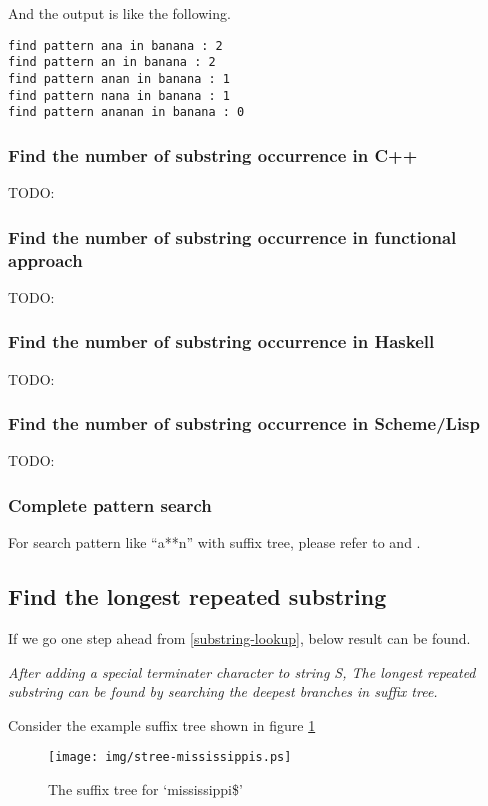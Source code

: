\documentclass{article}
\begin{document}
And the output is like the following.

\begin{verbatim}
find pattern ana in banana : 2
find pattern an in banana : 2
find pattern anan in banana : 1
find pattern nana in banana : 1
find pattern ananan in banana : 0
\end{verbatim}

\subsubsection*{Find the number of substring occurrence in C++}
TODO:

\subsubsection{Find the number of substring occurrence in functional approach}
TODO:

\subsubsection*{Find the number of substring occurrence in Haskell}
TODO:

\subsubsection*{Find the number of substring occurrence in Scheme/Lisp}
TODO:

\subsubsection{Complete pattern search}
For search pattern like ``a**n'' with suffix tree, please refer to \cite{ukkonen-lec} and \cite{ukkonen-search}.

\subsection{Find the longest repeated substring}

If we go one step ahead from \ref{substring-lookup}, below result can
be found.

{\em After adding a special terminater character to string S, The 
longest repeated substring can be found by searching the 
deepest branches in suffix tree.}

Consider the example suffix tree shown in figure \ref{fig:stree-mississippis}

\begin{figure}[htbp]
   \begin{center}
      \texttt{[image: img/stree-mississippis.ps]}
      \caption{The suffix tree for `mississippi\$'} \label{fig:stree-mississippis}
   \end{center}
\end{figure}
\end{document}
